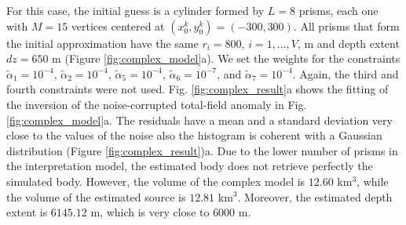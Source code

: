 For this case, the initial guess is a cylinder formed by $L=8$ prisms, each one with $M=15$ vertices centered at $(x_0^k, y_0^k) = (-300,300)$. All prisms that form the initial approximation have the same $r_i = 800$, $i = 1, \dots, V$, m and depth extent $dz=650$ m (Figure \ref{fig:complex_model}a). We set the weights for the constraints $\tilde{\alpha}_1 = 10^{-4}$, $\tilde{\alpha}_2 = 10^{-4}$, $\tilde{\alpha}_5 = 10^{-4}$, $\tilde{\alpha}_6 = 10^{-7}$, and $\tilde{\alpha}_7 = 10^{-4}$. Again, the third and fourth constraints were not used. Fig. \ref{fig:complex_result}a shows the fitting of the inversion of the noise-corrupted total-field anomaly in Fig. \ref{fig:complex_model}a. The residuals have a mean and a standard deviation very close to the values of the noise also the histogram is coherent with a Gaussian distribution (Figure \ref{fig:complex_result})a. Due to the lower number of prisms in the interpretation model, the estimated body does not retrieve perfectly the simulated body. However, the volume of the complex model is $12.60$ km$^3$, while the volume of the estimated source is $12.81$ km$^3$. Moreover, the estimated depth extent is $6145.12$ m, which is very close to $6000$ m. 